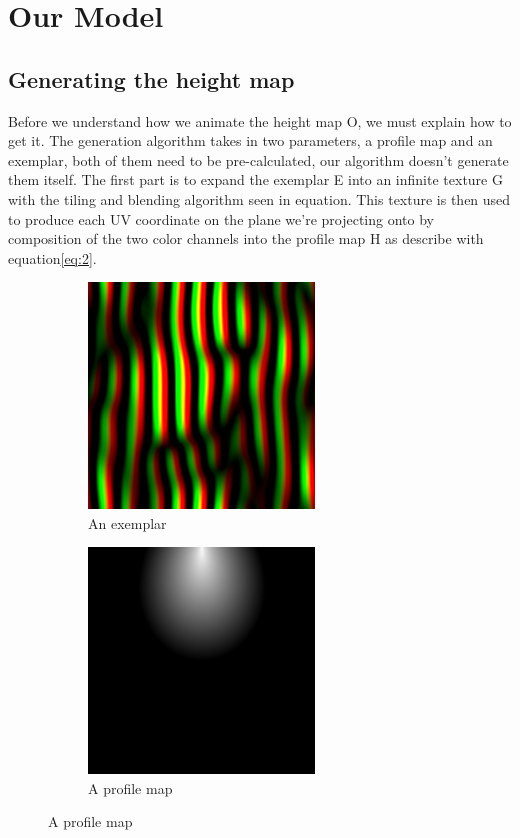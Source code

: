 \documentclass{article}
\begin{document}

\section{Our Model}

\subsection{Generating the height map}
Before we understand how we animate the height map O, we must explain how to get it. The generation algorithm takes in two parameters, a profile map and an exemplar, both of them need to be pre-calculated, our algorithm doesn't generate them itself. The first part is to expand the exemplar E into an infinite texture G with the tiling and blending algorithm seen in equation. This texture is then used to produce each UV coordinate on the plane we're projecting onto by composition of the two color channels into the profile map H as describe with equation\eqref{eq:2}.


\begin{figure}[H]
    \centering
    \begin{subfigure}[b]{0.48\linewidth}
        \centering
        \includegraphics[height=6cm, keepaspectratio]{images/exemplar.png}
        \caption{An exemplar}
    \end{subfigure}
    \hfill
    \begin{subfigure}[b]{0.48\linewidth}
        \centering
        \includegraphics[height=6cm, keepaspectratio]{images/profile_map.png}
        \caption{A profile map}
    \end{subfigure}
\end{figure}
\end{document}
